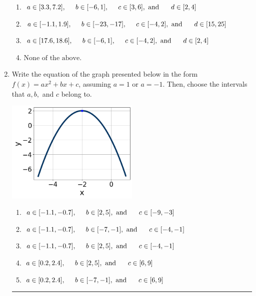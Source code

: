 \documentclass[14pt]{extbook}
\newcommand{\litem}[1]{\item#1\hspace*{-1cm}\rule{\textwidth}{0.4pt}}
\begin{document}
\begin{enumerate}
{\begin{enumerate}[label=\Alph*.]
\item \( a \in [3.3, 7.2], \hspace*{5mm} b \in [-6, 1], \hspace*{5mm} c \in [3, 6], \text{ and } \hspace*{5mm} d \in [2, 4] \)
\item \( a \in [-1.1, 1.9], \hspace*{5mm} b \in [-23, -17], \hspace*{5mm} c \in [-4, 2], \text{ and } \hspace*{5mm} d \in [15, 25] \)
\item \( a \in [17.6, 18.6], \hspace*{5mm} b \in [-6, 1], \hspace*{5mm} c \in [-4, 2], \text{ and } \hspace*{5mm} d \in [2, 4] \)
\item \( \text{None of the above.} \)

\end{enumerate} }
\litem{
Write the equation of the graph presented below in the form $f(x)=ax^2+bx+c$, assuming  $a=1$ or $a=-1$. Then, choose the intervals that $a, b,$ and $c$ belong to.
\begin{center}
    \includegraphics[width=0.5\textwidth]{../Figures/quadraticGraphToEquationC.png}
\end{center}
\begin{enumerate}[label=\Alph*.]
\item \( a \in [-1.1, -0.7], \hspace*{5mm} b \in [2, 5], \text{ and } \hspace*{5mm} c \in [-9, -3] \)
\item \( a \in [-1.1, -0.7], \hspace*{5mm} b \in [-7, -1], \text{ and } \hspace*{5mm} c \in [-4, -1] \)
\item \( a \in [-1.1, -0.7], \hspace*{5mm} b \in [2, 5], \text{ and } \hspace*{5mm} c \in [-4, -1] \)
\item \( a \in [0.2, 2.4], \hspace*{5mm} b \in [2, 5], \text{ and } \hspace*{5mm} c \in [6, 9] \)
\item \( a \in [0.2, 2.4], \hspace*{5mm} b \in [-7, -1], \text{ and } \hspace*{5mm} c \in [6, 9] \)


\end{enumerate}}
\end{enumerate}
\end{document}
